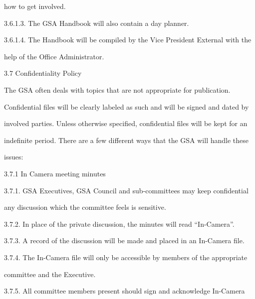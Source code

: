             how to get involved.   



3.6.1.3.     The GSA Handbook will also contain a day planner.   



3.6.1.4.     The Handbook will be compiled by the Vice President External with the  



             help of the Office Administrator.   



                          3.7      Confidentiality Policy  

                            

         The  GSA  often  deals  with  topics  that  are  not  appropriate  for  publication.  



Confidential files will be clearly labeled as such and will be signed and dated by  



involved parties. Unless otherwise specified, confidential files will be kept for an  



indefinite period. There are a few different ways that the GSA will handle these  



issues:  



3.7.1  In Camera meeting minutes  

  

3.7.1. GSA Executives, GSA Council and sub-committees may keep confidential  



         any discussion which the committee feels is sensitive.   



3.7.2. In place of the private discussion, the minutes will read “In-Camera”.   



3.7.3. A record of the discussion will be made and placed in an In-Camera file.   



3.7.4. The In-Camera file will only be accessible by members of the appropriate  



         committee and the Executive.   



3.7.5. All  committee  members  present  should  sign  and  acknowledge  In-Camera  



